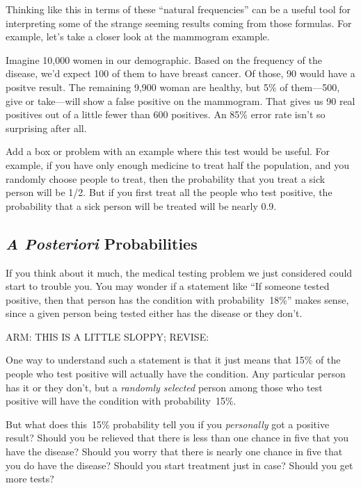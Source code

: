 Thinking like this in terms of these ``natural frequencies'' can be a
useful tool for interpreting some of the strange seeming results
coming from those formulas.  For example, let's take a closer look at
the mammogram example.

Imagine 10,000 women in our demographic.  Based on the frequency of
the disease, we'd expect 100 of them to have breast cancer.  Of those,
90 would have a positve result.  The remaining 9,900 woman are
healthy, but 5\% of them---500, give or take---will show a false
positive on the mammogram.  That gives us 90 real positives out of a
little fewer than 600 positives.  An 85\% error rate isn't so
surprising after all.

\begin{editingnotes}
Add a box or problem with an example where this test would be useful.
For example, if you have only enough medicine to treat half the
population, and you randomly choose people to treat, then the
probability that you treat a sick person will be 1/2.  But if you
first treat all the people who test positive, the probability that a
sick person will be treated will be nearly 0.9.
\end{editingnotes}


\subsection{\emph{A Posteriori} Probabilities}\label{aposteriori_subsec}

If you think about it much, the medical testing problem we just
considered could start to trouble you.  You may wonder if a statement
like ``If someone tested positive, then that person has the condition
with probability~18\%'' makes sense, since a given person being tested
either has the disease or they don't.

\begin{editingnotes}
ARM: THIS IS A LITTLE SLOPPY; REVISE:
\end{editingnotes}

One way to understand such a statement is that it just means that 15\%
of the people who test positive will actually have the condition.  Any
particular person has it or they don't, but a \emph{randomly selected}
person among those who test positive will have the condition with
probability~15\%.

But what does this~15\% probability tell you if you \emph{personally}
got a positive result?  Should you be relieved that there is less than
one chance in five that you have the disease?  Should you worry that
there is nearly one chance in five that you do have the disease?
Should you start treatment just in case?  Should you get more tests?

